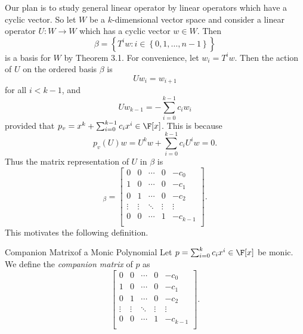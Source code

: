 \documentclass[linearalgebraII]{subfiles}
\begin{document}
    \begin{remark}
        Our plan is to study general linear operator by linear operators which have a cyclic vector. So let $W$ be a $k$-dimensional vector space and consider a linear operator $U:W\to W$ which has a cyclic vector $w\in W$. Then
        \begin{equation*}
            \beta = \left\lbrace T^iw: i\in \left\lbrace 0,1,\ldots,n-1 \right\rbrace  \right\rbrace 
        \end{equation*}
        is a basis for $W$ by Theorem 3.1. For convenience, let $w_i = T^iw$. Then the action of $U$ on the ordered basis $\beta$ is
        \begin{equation*}
            Uw_i = w_{i+1}
        \end{equation*}
        for all $i<k-1$, and
        \begin{equation*}
            Uw_{k-1} = - \sum^{k-1}_{i=0} c_iw_i
        \end{equation*}
        provided that $p_v = x^k + \sum^{k-1}_{i=0} c_ix^i\in\F[x]$. This is because
        \begin{equation*}
            p_v(U)w = U^kw + \sum^{k-1}_{i=0} c_iU^iw = 0.
        \end{equation*}
        Thus the matrix representation of $U$ in $\beta$ is
        \begin{equation*}
            [U]_\beta = 
            \begin{bmatrix}
                0 & 0 & \cdots & 0 & -c_0 \\
                1 & 0 & \cdots & 0 & -c_1 \\
                0 & 1 & \cdots & 0 & -c_2 \\
                \vdots & \vdots & \ddots  & \vdots & \vdots \\
                0 & 0 & \cdots & 1 & -c_{k-1} \\
            \end{bmatrix}.
        \end{equation*}
        This motivates the following definition.
    \end{remark}

    \begin{definition}{Companion Matrix}{of a Monic Polynomial}
        Let $p = \sum^{k}_{i=0} c_ix^i\in\F[x]$ be monic. We define the \emph{companion matrix} of $p$ as
        \begin{equation*}
            \begin{bmatrix}
                0 & 0 & \cdots & 0 & -c_0 \\
                1 & 0 & \cdots & 0 & -c_1 \\
                0 & 1 & \cdots & 0 & -c_2 \\
                \vdots & \vdots & \ddots  & \vdots & \vdots \\
                0 & 0 & \cdots & 1 & -c_{k-1} \\
            \end{bmatrix}.
        \end{equation*}
    \end{definition}
\end{document}
